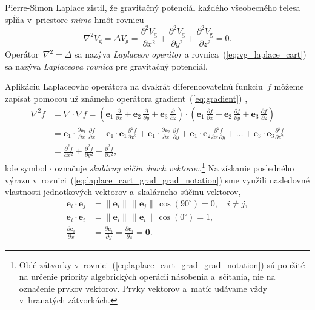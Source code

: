 \documentclass[a4paper, 12pt]{book}
\newcommand{\gidx}{\mathrm g}
\let\vec\mathbf
\begin{document}
Pierre-Simon Laplace zistil, že gravitačný potenciál každého všeobecného telesa
spĺňa v~priestore \emph{mimo} hmôt rovnicu
%
\begin{equation}
\label{eq:vg_laplace_cart}
\nabla^2 V_\gidx = \Delta V_\gidx = \frac{\partial^2 V_\gidx}{\partial x^2}
+ \frac{\partial^2 V_\gidx}{\partial y^2} + \frac{\partial^2 V_\gidx}{\partial
z^2} = 0{.}
\end{equation}
%
Operátor~$\nabla^2 = \Delta$ sa nazýva \emph{Laplaceov operátor} 
a rovnica~(\ref{eq:vg_laplace_cart}) sa nazýva \emph{Laplaceova rovnica} pre
gravitačný potenciál.

Aplikáciu Laplaceovho operátora na dvakrát diferencovateľnú funkciu~$f$ môžeme 
zapísať pomocou už známeho operátora gradient~(\ref{eq:gradient}) 
\parencite{SansoGeoidDetermination},
%
\begin{equation}
\label{eq:laplace_cart_grad_grad_notation}
\begin{split}
\nabla^2 f &= \nabla \cdot \nabla f = \left( \vec e_1 \, 
\frac{\partial}{\partial x} + \vec e_2 \, \frac{\partial}{\partial y} + \vec 
e_3 \, \frac{\partial}{\partial z} \right) \cdot \left( \vec e_1 \, 
\frac{\partial f}{\partial x} + \vec e_2 \, \frac{\partial f}{\partial y} 
+ \vec e_3 \, \frac{\partial f}{\partial z} \right)\\
%
&= \vec e_1 \cdot \frac{\partial \vec e_1}{\partial x} \, \frac{\partial 
f}{\partial x} + \vec e_1 \cdot \vec e_1 \frac{\partial^2 f}{\partial x^2} 
+ \vec e_1 \cdot \frac{\partial \vec e_2}{\partial x} \, \frac{\partial 
f}{\partial y} + \vec e_1 \cdot \vec e_2 \frac{\partial^2 f}{\partial x \, 
\partial y} + \dots + \vec e_3 \cdot \vec e_3 \frac{\partial^2 f}{\partial 
z^2}\\
%
&=\frac{\partial^2 f}{\partial x^2} + \frac{\partial^2 f}{\partial y^2} 
+ \frac{\partial^2 f}{\partial z^2}{,}
\end{split}
\end{equation}
%
kde symbol $\cdot$ označuje \emph{skalárny súčin dvoch vektorov}.\footnote{Oblé 
zátvorky v~rovnici~(\ref{eq:laplace_cart_grad_grad_notation}) sú použité na 
určenie priority algebrických operácií násobenia a~sčítania, nie na označenie 
prvkov vektorov.  Prvky vektorov a~matíc udávame vždy v~hranatých zátvorkách.} 
Na získanie posledného výrazu 
v~rovnici~(\ref{eq:laplace_cart_grad_grad_notation}) sme využili nasledovné 
vlastnosti jednotkových vektorov a~skalárneho súčinu vektorov,
%
\begin{align}
\label{eq:ei_orthogonality}
\vec e_i \cdot \vec e_j &= \| \vec e_i \| \, \| \vec e_j \| \, \cos(90^\circ) 
= 0{,} \quad i \neq j{,}\\
%
\label{eq:ei_unit_length}
\vec e_i \cdot \vec e_i &= \| \vec e_i \| \, \| \vec e_i \| \, \cos(0^\circ) 
= 1{,}\\
%
\label{eq:ei_derivatives}
\frac{\partial \vec e_i}{\partial x} &= \frac{\partial \vec e_i}{\partial y} 
= \frac{\partial \vec e_i}{\partial z} = \vec 0{.}
\end{align}
\end{document}
